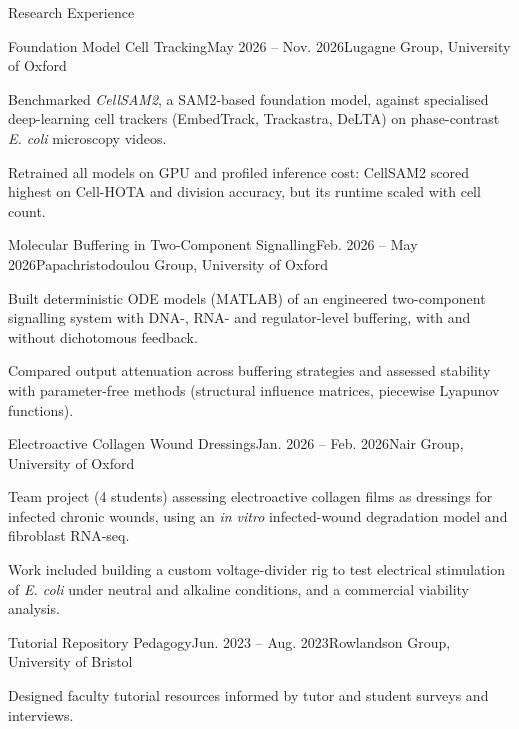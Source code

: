
\begin{rSection}{Research Experience}

    \begin{rSubsection}{Foundation Model Cell Tracking}{May 2026 -- Nov. 2026}{Lugagne Group, University of Oxford}{}
        \item Benchmarked \textit{CellSAM2}, a SAM2-based foundation model, against specialised deep-learning cell trackers (EmbedTrack, Trackastra, DeLTA) on phase-contrast \textit{E. coli} microscopy videos.
        \item Retrained all models on GPU and profiled inference cost: CellSAM2 scored highest on Cell-HOTA and division accuracy, but its runtime scaled with cell count.
    \end{rSubsection}

    \begin{rSubsection}{Molecular Buffering in Two-Component Signalling}{Feb. 2026 -- May 2026}{Papachristodoulou Group, University of Oxford}{}
        \item Built deterministic ODE models (MATLAB) of an engineered two-component signalling system with DNA-, RNA- and regulator-level buffering, with and without dichotomous feedback.
        \item Compared output attenuation across buffering strategies and assessed stability with parameter-free methods (structural influence matrices, piecewise Lyapunov functions).
    \end{rSubsection}

    \begin{rSubsection}{Electroactive Collagen Wound Dressings}{Jan. 2026 -- Feb. 2026}{Nair Group, University of Oxford}{}
        \item Team project (4 students) assessing electroactive collagen films as dressings for infected chronic wounds, using an \textit{in vitro} infected-wound degradation model and fibroblast RNA-seq.
        \item Work included building a custom voltage-divider rig to test electrical stimulation of \textit{E. coli} under neutral and alkaline conditions, and a commercial viability analysis.
    \end{rSubsection}

    \begin{rSubsection}{Tutorial Repository Pedagogy}{Jun. 2023 -- Aug. 2023}{Rowlandson Group, University of Bristol}{}
        \item Designed faculty tutorial resources informed by tutor and student surveys and interviews.
    \end{rSubsection}


\end{rSection}
